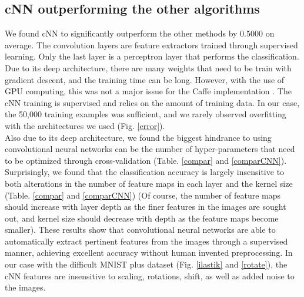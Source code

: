 \documentclass[conference]{IEEEtran}
\begin{document}
\subsection{cNN outperforming the other algorithms}
We found cNN to significantly outperform the other methods by 0.5000 on average. The convolution layers are feature extractors trained through supervised learning. Only the last layer is a perceptron layer that performs the classification. Due to its deep architecture, there are many weights that need to be train with gradient descent, and the training time can be long. However, with the use of GPU computing, this was not a major issue for the Caffe implementation  \cite{DBLP:journals/corr/Krizhevsky14,jia2014caffe}. The cNN training is supervised and relies on the amount of training data. In our case, the 50,000 training examples was sufficient, and we rarely observed overfitting with the architectures we used (Fig. \ref{error}).\\
Also due to its deep architecture, we found the biggest hindrance to using convolutional neural networks can be the number of hyper-parameters that need to be optimized through cross-validation (Table. \ref{compar} and \ref{comparCNN}). Surprisingly, we found that the classification accuracy is largely insensitive to both alterations in the number of feature maps in each layer and the kernel size (Table. \ref{compar} and \ref{comparCNN}) (Of course, the number of feature maps should increase with layer depth as the finer features in the images are sought out, and kernel size should decrease with depth as the feature maps become smaller). These results show that convolutional neural networks are able to automatically extract pertinent features from the images through a supervised manner, achieving excellent accuracy without human invented preprocessing. In our case with the difficult MNIST plus dataset (Fig. \ref{ilastik} and \ref{rotate}), the cNN features are insensitive to scaling, rotations, shift, as well as added noise to the images. 
\end{document}
